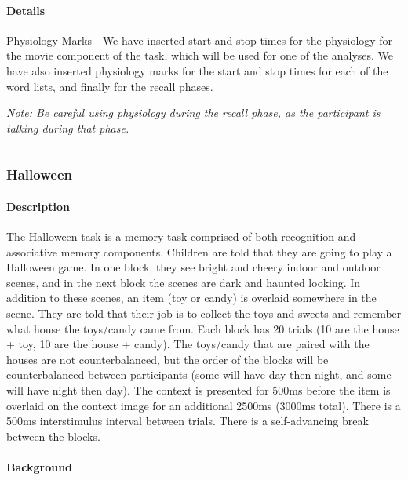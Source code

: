 \documentclass[]{book}
\let\oldparagraph\paragraph
\renewcommand{\paragraph}[1]{\oldparagraph{#1}\mbox{}}
\begin{document}
\hypertarget{details-1}{%
\paragraph{Details}\label{details-1}}

Physiology Marks - We have inserted start and stop times for the physiology for the movie component of the task, which will be used for one of the analyses. We have also inserted physiology marks for the start and stop times for each of the word lists, and finally for the recall phases.

\emph{Note: Be careful using physiology during the recall phase, as the participant is talking during that phase.}

\begin{center}\rule{0.5\linewidth}{0.5pt}\end{center}

\hypertarget{halloween}{%
\subsubsection{Halloween}\label{halloween}}

\hypertarget{description-2}{%
\paragraph{Description}\label{description-2}}

The Halloween task is a memory task comprised of both recognition and associative memory components. Children are told that they are going to play a Halloween game. In one block, they see bright and cheery indoor and outdoor scenes, and in the next block the scenes are dark and haunted looking. In addition to these scenes, an item (toy or candy) is overlaid somewhere in the scene. They are told that their job is to collect the toys and sweets and remember what house the toys/candy came from. Each block has 20 trials (10 are the house + toy, 10 are the house + candy). The toys/candy that are paired with the houses are not counterbalanced, but the order of the blocks will be counterbalanced between participants (some will have day then night, and some will have night then day). The context is presented for 500ms before the item is overlaid on the context image for an additional 2500ms (3000ms total). There is a 500ms interstimulus interval between trials. There is a self-advancing break between the blocks.

\hypertarget{background-1}{%
\paragraph{Background}\label{background-1}}
\end{document}
